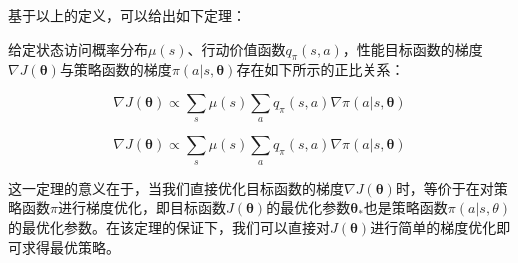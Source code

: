 基于以上的定义，可以给出如下定理：

\begin{theorem}
给定状态访问概率分布$\mu(s)$、行动价值函数$q_\pi(s,a)$，性能目标函数的梯度$\nabla J(\boldsymbol{\theta})$与策略函数的梯度$\pi(a | s, \boldsymbol{\theta})$存在如下所示的正比关系：

\begin{equation}
    \nabla J(\boldsymbol{\theta}) \propto \sum_{s} \mu(s) \sum_{a} q_{\pi}(s, a) \nabla \pi(a | s, \boldsymbol{\theta})
\end{equation}
\end{theorem}

$$
\nabla J(\boldsymbol{\theta}) \propto \sum_{s} \mu(s) \sum_{a} q_{\pi}(s, a) \nabla \pi(a | s, \boldsymbol{\theta})
$$

这一定理的意义在于，当我们直接优化目标函数的梯度$\nabla J(\boldsymbol{\theta})$时，等价于在对策略函数$\pi$进行梯度优化，即目标函数$J(\boldsymbol{\theta})$的最优化参数$\boldsymbol{\theta_*}$也是策略函数$\pi(a|s,\theta)$的最优化参数。在该定理的保证下，我们可以直接对$J(\boldsymbol{\theta})$进行简单的梯度优化即可求得最优策略。





